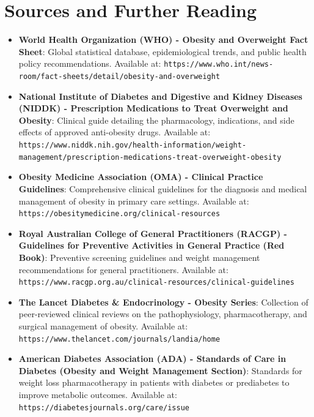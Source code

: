 \section*{Sources and Further Reading}
\begin{itemize}
\item \textbf{World Health Organization (WHO) - Obesity and Overweight Fact Sheet}: Global statistical database, epidemiological trends, and public health policy recommendations. Available at: \texttt{https://www.who.int/news-room/fact-sheets/detail/obesity-and-overweight}
\item \textbf{National Institute of Diabetes and Digestive and Kidney Diseases (NIDDK) - Prescription Medications to Treat Overweight and Obesity}: Clinical guide detailing the pharmacology, indications, and side effects of approved anti-obesity drugs. Available at: \texttt{https://www.niddk.nih.gov/health-information/weight-management/prescription-medications-treat-overweight-obesity}
\item \textbf{Obesity Medicine Association (OMA) - Clinical Practice Guidelines}: Comprehensive clinical guidelines for the diagnosis and medical management of obesity in primary care settings. Available at: \texttt{https://obesitymedicine.org/clinical-resources}
\item \textbf{Royal Australian College of General Practitioners (RACGP) - Guidelines for Preventive Activities in General Practice (Red Book)}: Preventive screening guidelines and weight management recommendations for general practitioners. Available at: \texttt{https://www.racgp.org.au/clinical-resources/clinical-guidelines}
\item \textbf{The Lancet Diabetes \& Endocrinology - Obesity Series}: Collection of peer-reviewed clinical reviews on the pathophysiology, pharmacotherapy, and surgical management of obesity. Available at: \texttt{https://www.thelancet.com/journals/landia/home}
\item \textbf{American Diabetes Association (ADA) - Standards of Care in Diabetes (Obesity and Weight Management Section)}: Standards for weight loss pharmacotherapy in patients with diabetes or prediabetes to improve metabolic outcomes. Available at: \texttt{https://diabetesjournals.org/care/issue}
\end{itemize}